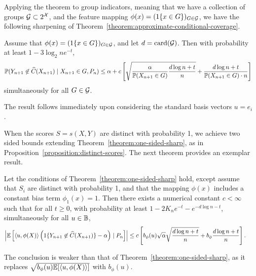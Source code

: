 \documentclass{article}
\newcommand{\radphi}{b_{\phi}}
\newcommand{\scorefunc}{s}
\newcommand{\scoreval}{\scorefunc}
\newcommand{\scorerv}{S}
\begin{document}
Applying the theorem to group indicators, meaning that we have a collection
of groups $\mathcal{G} \subset 2^{\mathcal{X}}$, and the feature mapping $\phi(x) =
(1\!\left\{x \in G\right\})_{G \in \mathcal{G}}$, we have the following sharpening
of Theorem~\ref{theorem:approximate-conditional-coverage}.
\begin{corollary}
  \label{corollary:group-conditional-teenager}
  Assume that $\phi(x) = (1\!\left\{x \in G\right\})_{G \in \mathcal{G}}$,
  and let $d = \mathop{\rm card}(\mathcal{G})$.
  Then with probability at least
  $1 - 3 \log_2 n e^{-t}$,
  \begin{equation*}
    \mathbb{P}(Y_{n + 1} \not \in \widehat{C}(X_{n + 1}) \mid X_{n + 1} \in G,
    P_n)
    \le \alpha +
    c \left[\sqrt{\frac{\alpha}{\mathbb{P}(X_{n + 1} \in G)}
        \frac{d \log n + t}{n}} +
      \frac{d \log n + t}{\mathbb{P}(X_{n + 1} \in G) \cdot n} \right]
  \end{equation*}
  simultaneously for all $G \in \mathcal{G}$.
\end{corollary}
\noindent
The result follows immediately upon considering the standard basis
vectors $u = e_i$.
%

When the scores $\scorerv = \scoreval(X, Y)$ are distinct with probability
1, we achieve two sided bounds extending
Theorem~\ref{theorem:one-sided-sharp}, as in
Proposition~\ref{proposition:distinct-scores}.
%
The next theorem provides an exemplar result.

\begin{theorem}
  \label{theorem:two-sided-sharp}
  Let the conditions of Theorem~\ref{theorem:one-sided-sharp} hold,
  except assume that $\scorerv_i$ are distinct with probability 1,
  and that the mapping $\phi(x)$ includes a constant bias
  term $\phi_1(x) = 1$.
  Then there exists a numerical
  constant $c < \infty$ such that for all
  $t \ge 0$, with probability at least
  $1 - 2 K_n e^{-t} - e^{-d \log n -t}$,
  simultaneously for all $u \in \mathbb{B}$,
  \begin{align*}
    \left|\E\left[\<u, \phi(X)\> \left(\indics{Y_{n + 1}
          \not \in \what{C}(X_{n + 1})} - \alpha\right)
        \mid P_n \right]\right|
    & \le c \left[\radphi(u) \sqrt{\alpha}
      \sqrt{\frac{d \log n + t}{n}}
      + \radphi\frac{d \log n + t}{n} \right].
  \end{align*}
\end{theorem}
\noindent
The conclusion is weaker than that of Theorem~\ref{theorem:one-sided-sharp},
as it replaces $\sqrt{\radphi(u) \E[\<u, \phi(X)\>]}$ with $\radphi(u)$.
\end{document}
